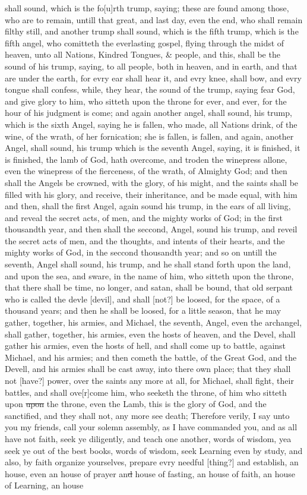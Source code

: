 shall sound, which is the fo[u]rth trump, saying; these are found among those, who are to remain, untill that great, and last day, even the end, who shall remain filthy still, and another trump shall sound, which is the fifth trump, which is the fifth angel, who comitteth the everlasting gospel, flying through the midst of heaven, unto all Nations, Kindred Tongues, \& people, and this, shall be the sound of his trump, saying, to all people, both in heaven, and in earth, and that are under the earth, for evry ear shall hear it, and evry knee, shall bow, and evry tongue shall confess, while, they hear, the sound of the trump, saying fear God, and give glory to him, who sitteth upon the throne for ever, and ever, for the hour of his judgment is come; and again another angel, shall sound, his trump, which is the sixth Angel, saying he is fallen, who made, all Nations drink, of the wine, of the wrath, of her fornication; she is fallen, is fallen, and again, another Angel, shall sound, his trump which is the seventh Angel, saying, it is finished, it is finished, the lamb of God, hath overcome, and troden the winepress allone, even the winepress of the fierceness, of the wrath, of Almighty God; and then shall the Angels be crowned, with the glory, of his might, and the saints shall be filled with his glory, and receive, their inheritance, and be made equal, with him and then, shall the first Angel, again sound his trump, in the ears of all living, and reveal the secret acts, of men, and the mighty works of God; in the first thousandth year, and then shall the seccond, Angel, sound his trump, and reveil the secret acts of men, and the thoughts, and intents of their hearts, and the mighty works of God, in the seccond thousandth year; and so on untill the seventh, Angel shall sound, his trump, and he shall stand forth upon the land, and upon the sea, and sware, in the name of him, who sitteth upon the throne, that there shall be time, no longer, and satan, shall be bound, that old serpant who is called the devle [devil], and shall [not?] be loosed, for the space, of a thousand years; and then he shall be loosed, for a little season, that he may gather, together, his armies, and Michael, the seventh, Angel, even the archangel, shall gather, together, his armies, even the hosts of heaven, and the Devel, shall gather his armies, even the hosts of hell, and shall come up to battle, against Michael, and his armies; and then cometh the battle, of the Great God, and the Devell, and his armies shall be cast away, into there own place; that they shall not [have?] power, over the saints any more at all, for Michael, shall fight, their battles, and shall ove[r]come him, who seeketh the throne, of him who sitteth upon \sout{upon} the throne, even the Lamb, this is the glory of God, and the sanctified, and they shall not, any more see death; Therefore verily, I say unto you my friends, call your solemn assembly, as I have commanded you, and as all have not faith, seek ye diligently, and teach one another, words of wisdom, yea seek ye out of the best books, words of wisdom, seek Learning even by study, and also, by faith organize yourselves, prepare evry needful [thing?] and establish, an house, even an house of prayer an\sout{d} house of fasting, an house of faith, an house of Learning, an house 